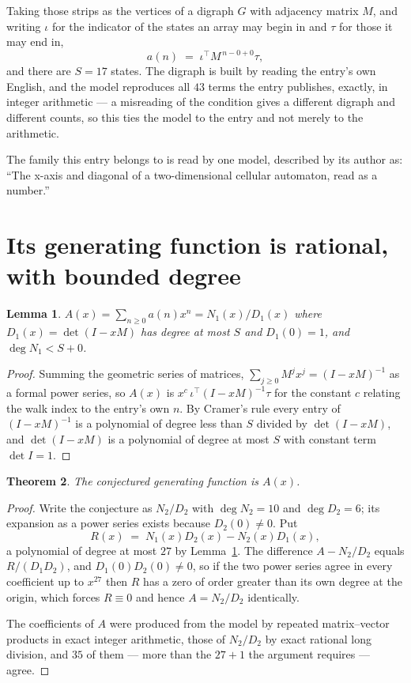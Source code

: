\documentclass[11pt,a4paper]{article}
\theoremstyle{plain}
\newtheorem{theorem}{Theorem}
\newtheorem{lemma}[theorem]{Lemma}
\theoremstyle{definition}
\begin{document}
Taking those strips as the vertices of a digraph $G$ with adjacency matrix $M$, and writing
$\iota$ for the indicator of the states an array may begin in and $\tau$ for those it may end
in,
\[
a(n)\;=\;\iota^{\!\top}M^{\,n-0+0}\tau ,
\]
and there are $S=17$ states. The digraph is built by reading the entry's own English, and the
model reproduces all $43$ terms the entry publishes, exactly, in integer arithmetic --- a
misreading of the condition gives a different digraph and different counts, so this ties the
model to the entry and not merely to the arithmetic.

The family this entry belongs to is read by one model, described by its author as: ``The x-axis and diagonal of a two-dimensional cellular automaton, read as a number.''


\section{Its generating function is rational, with bounded degree}

\begin{lemma}\label{lem:rat}
$A(x)=\sum_{n\ge0}a(n)x^n=N_1(x)/D_1(x)$ where $D_1(x)=\det(I-xM)$ has degree at most
$S$ and $D_1(0)=1$, and $\deg N_1<S+0$.
\end{lemma}

\begin{proof}
Summing the geometric series of matrices, $\sum_{j\ge0}M^jx^j=(I-xM)^{-1}$ as a formal
power series, so $A(x)$ is $x^{c}\,\iota^{\!\top}(I-xM)^{-1}\tau$ for the constant $c$
relating the walk index to the entry's own $n$. By Cramer's rule every entry of
$(I-xM)^{-1}$ is a polynomial of degree less than $S$ divided by $\det(I-xM)$, and
$\det(I-xM)$ is a polynomial of degree at most $S$ with constant term $\det I=1$.
\end{proof}

\begin{theorem}
The conjectured generating function is $A(x)$.
\end{theorem}

\begin{proof}
Write the conjecture as $N_2/D_2$ with $\deg N_2=10$ and $\deg D_2=6$; its expansion as a
power series exists because $D_2(0)\neq0$. Put
\[
R(x)\;=\;N_1(x)D_2(x)-N_2(x)D_1(x),
\]
a polynomial of degree at most $27$ by Lemma~\ref{lem:rat}. The difference
$A-N_2/D_2$ equals $R/(D_1D_2)$, and $D_1(0)D_2(0)\neq0$, so if the two power series agree in
every coefficient up to $x^{27}$ then $R$ has a zero of order greater than its own
degree at the origin, which forces $R\equiv0$ and hence $A=N_2/D_2$ identically.

The coefficients of $A$ were produced from the model by repeated matrix--vector products in
exact integer arithmetic, those of $N_2/D_2$ by exact rational long division, and $35$
of them --- more than the $27+1$ the argument requires --- agree.
\end{proof}
\end{document}
